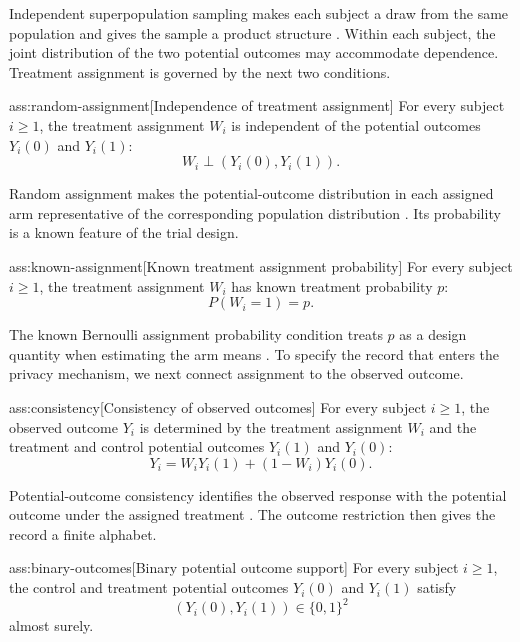 \documentclass[11pt]{article}
\begin{document}
Independent superpopulation sampling makes each subject a draw from the same population and gives the sample a product structure \citep{OhnishiAwan2025}. Within each subject, the joint distribution of the two potential outcomes may accommodate dependence. Treatment assignment is governed by the next two conditions.

\begin{assumptionv}{ass:random-assignment}[Independence of treatment assignment]
For every subject \(i\ge1\), the treatment assignment \(W_i\) is independent of the potential outcomes \(Y_i(0)\) and \(Y_i(1)\):
\[
W_i\mathrel{\perp}(Y_i(0),Y_i(1)).
\]
\end{assumptionv}

Random assignment makes the potential-outcome distribution in each assigned arm representative of the corresponding population distribution \citep{OhnishiAwan2025}. Its probability is a known feature of the trial design.

\begin{assumptionv}{ass:known-assignment}[Known treatment assignment probability]
For every subject \(i\ge1\), the treatment assignment \(W_i\) has known treatment probability \(p\):
\[
P(W_i=1)=p.
\]
\end{assumptionv}

The known Bernoulli assignment probability condition treats \(p\) as a design quantity when estimating the arm means \citep{OhnishiAwan2025}. To specify the record that enters the privacy mechanism, we next connect assignment to the observed outcome.

\begin{assumptionv}{ass:consistency}[Consistency of observed outcomes]
For every subject \(i\ge1\), the observed outcome \(Y_i\) is determined by the treatment assignment \(W_i\) and the treatment and control potential outcomes \(Y_i(1)\) and \(Y_i(0)\):
\[
Y_i=W_iY_i(1)+(1-W_i)Y_i(0).
\]
\end{assumptionv}

Potential-outcome consistency identifies the observed response with the potential outcome under the assigned treatment \citep{OhnishiAwan2025}. The outcome restriction then gives the record a finite alphabet.

\begin{assumptionv}{ass:binary-outcomes}[Binary potential outcome support]
For every subject \(i\ge1\), the control and treatment potential outcomes \(Y_i(0)\) and \(Y_i(1)\) satisfy
\[
(Y_i(0),Y_i(1))\in\{0,1\}^2
\]
almost surely.
\end{assumptionv}
\end{document}
